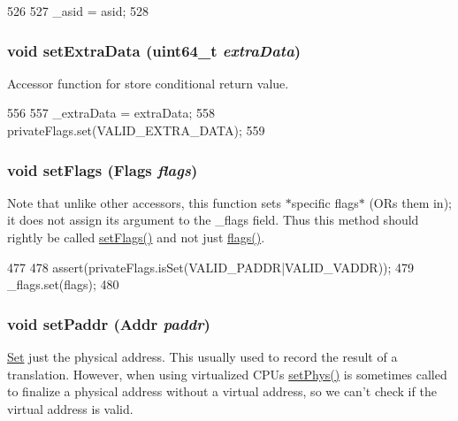 \begin{DoxyCode}
526     {
527         _asid = asid;
528     }
\end{DoxyCode}
\hypertarget{classRequest_ac73800a0bae4776befb9d416e95ea6d9}{
\subsubsection[{setExtraData}]{\setlength{\rightskip}{0pt plus 5cm}void setExtraData (uint64\_\-t {\em extraData})}}
\label{classRequest_ac73800a0bae4776befb9d416e95ea6d9}
Accessor function for store conditional return value. 


\begin{DoxyCode}
556     {
557         _extraData = extraData;
558         privateFlags.set(VALID_EXTRA_DATA);
559     }
\end{DoxyCode}
\hypertarget{classRequest_a33971d22712c9c80177e4362dffd5580}{
\subsubsection[{setFlags}]{\setlength{\rightskip}{0pt plus 5cm}void setFlags ({\bf Flags} {\em flags})}}
\label{classRequest_a33971d22712c9c80177e4362dffd5580}
Note that unlike other accessors, this function sets $\ast$specific flags$\ast$ (ORs them in); it does not assign its argument to the \_\-flags field. Thus this method should rightly be called \hyperlink{classRequest_a33971d22712c9c80177e4362dffd5580}{setFlags()} and not just \hyperlink{namespacem5_1_1debug_a9ceb38153d5c0f156fbeada6dc00ff4f}{flags()}. 


\begin{DoxyCode}
477     {
478         assert(privateFlags.isSet(VALID_PADDR|VALID_VADDR));
479         _flags.set(flags);
480     }
\end{DoxyCode}
\hypertarget{classRequest_a688b841276b48f5c420569e62a090130}{
\subsubsection[{setPaddr}]{\setlength{\rightskip}{0pt plus 5cm}void setPaddr ({\bf Addr} {\em paddr})}}
\label{classRequest_a688b841276b48f5c420569e62a090130}
\hyperlink{classSet}{Set} just the physical address. This usually used to record the result of a translation. However, when using virtualized CPUs \hyperlink{classRequest_aeefca2329f8f252cd5c17463dc7f8fda}{setPhys()} is sometimes called to finalize a physical address without a virtual address, so we can't check if the virtual address is valid. 


